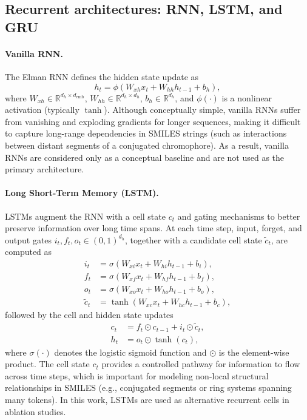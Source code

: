 \documentclass[11pt,a4paper]{article}
\begin{document}
\subsection{Recurrent architectures: RNN, LSTM, and GRU}
\label{subsec:rnn_architectures}

\paragraph{Vanilla RNN.}
The Elman RNN defines the hidden state update as
\begin{equation}
  h_t = \phi\left( W_{xh} x_t + W_{hh} h_{t-1} + b_h \right),
\end{equation}
where $W_{xh} \in \mathbb{R}^{d_h \times d_{\mathrm{emb}}}$, $W_{hh} \in \mathbb{R}^{d_h \times d_h}$, $b_h \in \mathbb{R}^{d_h}$, and $\phi(\cdot)$ is a nonlinear activation (typically $\tanh$). Although conceptually simple, vanilla RNNs suffer from vanishing and exploding gradients for longer sequences, making it difficult to capture long-range dependencies in SMILES strings (such as interactions between distant segments of a conjugated chromophore). As a result, vanilla RNNs are considered only as a conceptual baseline and are not used as the primary architecture.

\paragraph{Long Short-Term Memory (LSTM).}
LSTMs augment the RNN with a cell state $c_t$ and gating mechanisms to better preserve information over long time spans. At each time step, input, forget, and output gates $i_t, f_t, o_t \in (0,1)^{d_h}$, together with a candidate cell state $\tilde{c}_t$, are computed as
\begin{align}
  i_t &= \sigma(W_{xi} x_t + W_{hi} h_{t-1} + b_i), \\
  f_t &= \sigma(W_{xf} x_t + W_{hf} h_{t-1} + b_f), \\
  o_t &= \sigma(W_{xo} x_t + W_{ho} h_{t-1} + b_o), \\
  \tilde{c}_t &= \tanh(W_{xc} x_t + W_{hc} h_{t-1} + b_c),
\end{align}
followed by the cell and hidden state updates
\begin{align}
  c_t &= f_t \odot c_{t-1} + i_t \odot \tilde{c}_t, \\
  h_t &= o_t \odot \tanh(c_t),
\end{align}
where $\sigma(\cdot)$ denotes the logistic sigmoid function and $\odot$ is the element-wise product. The cell state $c_t$ provides a controlled pathway for information to flow across time steps, which is important for modeling non-local structural relationships in SMILES (e.g., conjugated segments or ring systems spanning many tokens). In this work, LSTMs are used as alternative recurrent cells in ablation studies.
\end{document}
